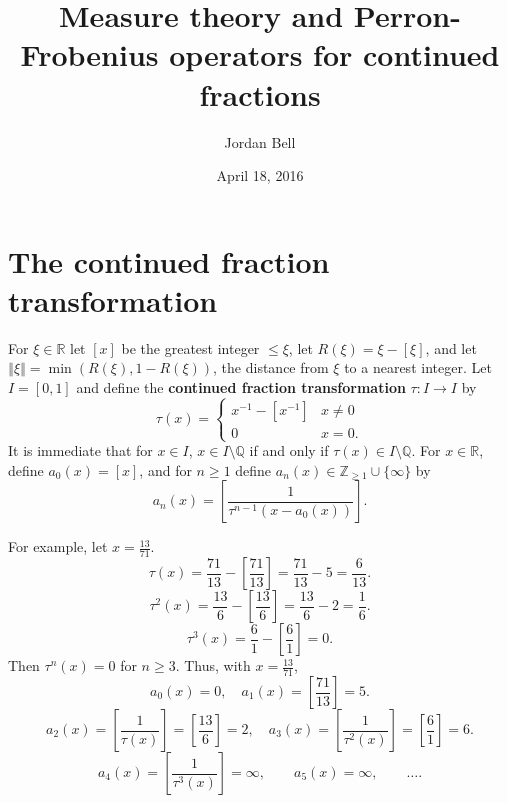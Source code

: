 \documentclass{article}
\newcommand{\norm}[1]{\left\Vert #1 \right\Vert}
\theoremstyle{definition}
\begin{document}
\title{Measure theory and Perron-Frobenius operators for continued fractions}
\author{Jordan Bell}
\date{April 18, 2016}

\maketitle


\section{The continued fraction transformation}
For $\xi \in \mathbb{R}$ let $[x]$ be the greatest integer $\leq \xi$, let $R(\xi)=\xi-[\xi]$, and let $\norm{\xi} = \min(R(\xi),1-R(\xi))$, the distance from $\xi$ to a nearest integer.
Let $I=[0,1]$ and define the \textbf{continued fraction transformation} $\tau:I \to I$ by
\[
\tau(x)=\begin{cases}
x^{-1}-[x^{-1}]&x \neq 0\\
0&x=0.
\end{cases}
\]
It is immediate that for $x \in I$, $x \in I \setminus \mathbb{Q}$ if and only if $\tau(x) \in I \setminus \mathbb{Q}$.
For $x \in \mathbb{R}$,
define $a_0(x) = [x]$, and for $n \geq 1$ define $a_n(x) \in \mathbb{Z}_{\geq 1} \cup \{\infty\}$ by
\[
a_n(x) = \left[ \frac{1}{\tau^{n-1}(x-a_0(x))} \right].
\]

For example, let $x=\frac{13}{71}$.
\[
\tau(x) = \frac{71}{13} - \left[\frac{71}{13} \right] = \frac{71}{13} - 5 = \frac{6}{13}.
\]
\[
\tau^2(x) = \frac{13}{6} - \left[\frac{13}{6}\right] = \frac{13}{6}-2= \frac{1}{6}.
\]
\[
\tau^3(x) = \frac{6}{1}-\left[\frac{6}{1}\right] = 0.
\]
Then $\tau^n(x)=0$ for $n \geq 3$. Thus, with $x=\frac{13}{71}$,
\[
a_0(x)=0,\quad a_1(x) =  \left[\frac{71}{13} \right] = 5.
\]
\[
a_2(x) = \left[\frac{1}{\tau(x)}\right] = \left[\frac{13}{6}\right]=2,\quad
a_3(x) = \left[\frac{1}{\tau^2(x)} \right] = \left[\frac{6}{1}\right]=6.
\]
\[
a_4(x)=\left[\frac{1}{\tau^3(x)}\right] = \infty, \qquad a_5(x) = \infty, \qquad \ldots.
\]
\end{document}
